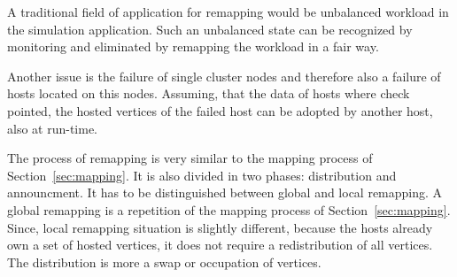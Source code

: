 A traditional field of application for remapping would be unbalanced
workload in the simulation application. Such an unbalanced state can
be recognized by monitoring and eliminated by remapping the workload
in a fair way.

Another issue is the failure of single cluster nodes and therefore
also a failure of hosts located on this nodes. Assuming, that the data
of hosts where check pointed, the hosted vertices of the failed host
can be adopted by another host, also at run-time.

The process of remapping is very similar to the mapping process of
Section~\ref{sec:mapping}.  It is also divided in two phases:
distribution and announcment. It has to be distinguished between
global and local remapping. A global remapping is a repetition of the
mapping process of Section~\ref{sec:mapping}.  Since, local remapping
situation is slightly different, because the hosts already own a set
of hosted vertices, it does not require a redistribution of all
vertices.  The distribution is more a swap or occupation of vertices.


\cleardoublepage

